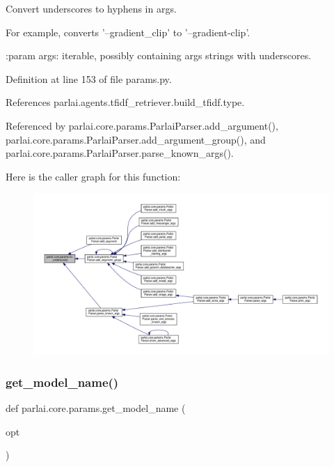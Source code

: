 \begin{DoxyVerb}Convert underscores to hyphens in args.

For example, converts '--gradient_clip' to '--gradient-clip'.

:param args: iterable, possibly containing args strings with underscores.
\end{DoxyVerb}
 

Definition at line 153 of file params.\+py.



References parlai.\+agents.\+tfidf\+\_\+retriever.\+build\+\_\+tfidf.\+type.



Referenced by parlai.\+core.\+params.\+Parlai\+Parser.\+add\+\_\+argument(), parlai.\+core.\+params.\+Parlai\+Parser.\+add\+\_\+argument\+\_\+group(), and parlai.\+core.\+params.\+Parlai\+Parser.\+parse\+\_\+known\+\_\+args().

Here is the caller graph for this function\+:
\nopagebreak
\begin{figure}[H]
\begin{center}
\leavevmode
\includegraphics[width=350pt]{namespaceparlai_1_1core_1_1params_afe2837a1dc21017be30cc7e3cb3696b8_icgraph}
\end{center}
\end{figure}
\mbox{\label{namespaceparlai_1_1core_1_1params_a6d160324f6af84562334fd0698141074}} 
\subsubsection{\texorpdfstring{get\+\_\+model\+\_\+name()}{get\_model\_name()}}
{\footnotesize\ttfamily def parlai.\+core.\+params.\+get\+\_\+model\+\_\+name (\begin{DoxyParamCaption}\item[{}]{opt }\end{DoxyParamCaption})}


